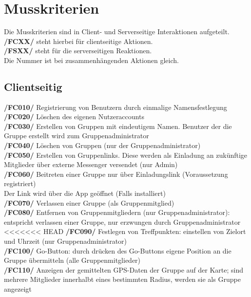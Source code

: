 \newpage
\section{Musskriterien}
Die Musskriterien sind in Client- und Serverseitige Interaktionen aufgeteilt.\\
\textbf{/FCXX/} steht hierbei für clientseitige Aktionen.\\
\textbf{/FSXX/} steht für die serverseitigen Reaktionen.\\
Die Nummer ist bei zusammenhängenden Aktionen gleich.\\
\subsection{Clientseitig}
     \textbf{/FC010/} Registrierung von Benutzern durch einmalige Namensfestlegung\\
     \textbf{/FC020/} Löschen des eigenen Nutzeraccounts\\
     \textbf{/FC030/} Erstellen von Gruppen mit eindeutigem Namen. Benutzer der die Gruppe erstellt wird zum Gruppenadministrator\\
     \textbf{/FC040/} Löschen von Gruppen (nur der Gruppenadministrator)   \\
     \textbf{/FC050/} Erstellen von Gruppenlinks. Diese werden als Einladung an zukünftige Mitglieder über externe Messenger versendet (nur Admin)\\
     \textbf{/FC060/} Beitreten einer Gruppe nur über Einladungslink (Voraussetzung registriert) \\
     Der Link wird über die App geöffnet (Falls installiert) \\
     \textbf{/FC070/} Verlassen einer Gruppe (als Gruppenmitglied)\\
     \textbf{/FC080/} Entfernen von Gruppenmitgliedern (nur Gruppenadministrator): entspricht verlassen einer Gruppe, nur erzwungen durch Gruppenadministrator\\
<<<<<<< HEAD
     \textbf{/FC090/} Festlegen von Treffpunkten: einstellen von Zielort und Uhrzeit (nur Gruppenadministrator)\\
     \textbf{/FC100/} Go-Button: durch drücken des Go-Buttons eigene Position an die Gruppe übermitteln (alle Gruppenmitglieder)\\
     \textbf{/FC110/} Anzeigen der gemittelten GPS-Daten der Gruppe auf der Karte; sind mehrere Mitglieder innerhalbt eines bestimmten Radius,
     werden sie als Gruppe angezeigt\\
